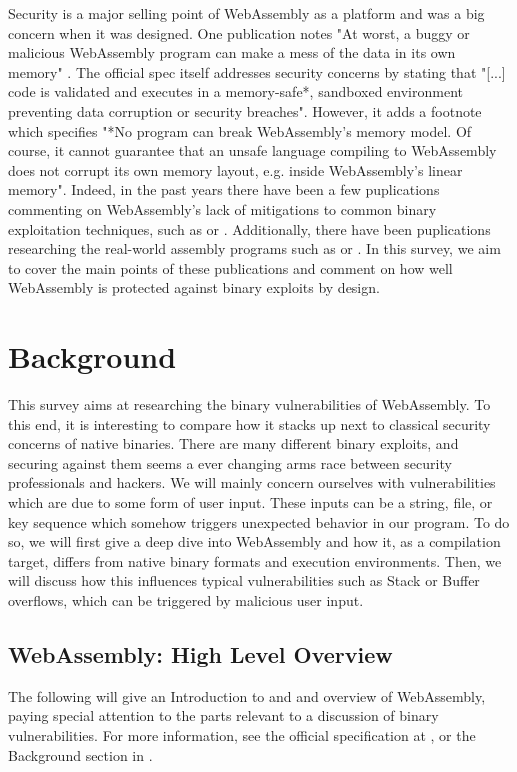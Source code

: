 \documentclass[sigconf]{acmart}
\begin{document}
Security is a major selling point of WebAssembly as a platform and was a big concern when it was designed. One publication notes "At worst, a buggy or malicious WebAssembly program can make a mess of the data in its own memory" \cite{rossberg_bringing_2018}. The official spec itself addresses security concerns by stating that "[...] code is validated and executes in a memory-safe*, sandboxed environment preventing data corruption or security breaches". However, it adds a footnote which specifies "*No program can break WebAssembly’s memory model. Of course, it cannot guarantee that an unsafe language compiling to WebAssembly does not corrupt its own memory layout, e.g. inside WebAssembly’s linear memory". Indeed, in the past years there have been a few puplications commenting on WebAssembly's lack of mitigations to common binary exploitation techniques, such as \cite{mcfadden_security_2018} or \cite{lehmann_everything_2020}. Additionally, there have been puplications researching the real-world assembly programs such as \cite{musch_new_2019} or \cite{hilbig_empirical_2021}. In this survey, we aim to cover the main points of these publications and comment on how well WebAssembly is protected against binary exploits by design. 

\section{Background}
\label{sec:background}
This survey aims at researching the binary vulnerabilities of WebAssembly. To this end, it is interesting to compare how it stacks up next to classical security concerns of native binaries. There are many different binary exploits, and securing against them seems a ever changing arms race between security professionals and hackers. We will mainly concern ourselves with vulnerabilities which are due to some form of user input. These inputs can be a string, file, or key sequence which somehow triggers unexpected behavior in our program. To do so, we will first give a deep dive into WebAssembly and how it, as a compilation target, differs from native binary formats and execution environments. Then, we will discuss how this influences typical vulnerabilities such as Stack or Buffer overflows, which can be triggered by malicious user input.

\subsection{WebAssembly: High Level Overview}
\label{sec:wasm}
The following will give an Introduction to and and overview of WebAssembly, paying special attention to the parts relevant to a discussion of binary vulnerabilities. For more information, see the official specification at \cite{webAssembly_spec_2021}, or the Background section in \cite{lehmann_everything_2020}. 
\end{document}
